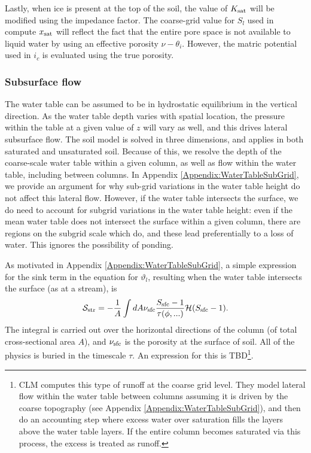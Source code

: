 \documentclass[twoside,10pt]{report}
\begin{document}
Lastly, when ice is present at the top of the soil, the value of $K_{\rm sat}$ will be modified using the impedance factor. The coarse-grid value for $S_l$ used in compute $x_{\rm sat}$ will reflect the fact that the entire pore space is not available to liquid water by using an effective porosity $\nu - \theta_i$. However, the matric potential used in $i_c$ is evaluated using the true porosity.




\subsubsection{Subsurface flow}
The water table can be assumed to be in hydrostatic equilibrium in the vertical direction. As the water table depth varies with spatial location, the pressure within the table at a given value of $z$ will vary as well, and this drives lateral subsurface flow. The soil model is solved in three dimensions, and applies in both saturated and unsaturated soil. Because of this, we resolve the depth of the coarse-scale water table within a given column, as well as flow within the water table, including between columns. In Appendix \ref{Appendix:WaterTableSubGrid}, we provide an argument for why sub-grid variations in the water table height do not affect this lateral flow. However, if the water table intersects the surface, we do need to account for subgrid variations in the water table height: even if the mean water table does not intersect the surface within a given column, there are regions on the subgrid scale which do, and these lead preferentially to a loss of water. This ignores the possibility of ponding. 

As motivated in Appendix \ref{Appendix:WaterTableSubGrid}, a simple expression for the sink term in the equation for $\vartheta_l$, resulting when the water table intersects the surface (as at a stream), is
\begin{align}\label{eq:baseflow_sink}
    \mathcal{S_{\rm str}} &= -\frac{1}{A}\int dA \nu_{\rm sfc}\frac{S_{\rm sfc}-1}{\tau(\phi,...)} \mathcal{H}(S_{\rm sfc} - 1). \nonumber \\
\end{align}
The integral is carried out over the horizontal directions of the column (of total cross-sectional area $A$), and $\nu_{\rm sfc}$ is the porosity at the surface of soil. All of the physics is buried in the timescale $\tau$. An expression for this is TBD\footnote{CLM computes this type of runoff at the coarse grid level. They model lateral flow within the water table between columns assuming it is driven by the coarse topography (see Appendix \ref{Appendix:WaterTableSubGrid}), and then do an accounting step where excess water over saturation fills the layers above the water table layers. If the entire column becomes saturated via this process, the excess is treated as runoff.}. 
\end{document}
